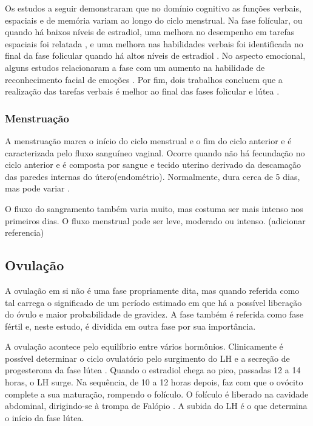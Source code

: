 Os estudos a seguir demonstraram que no domínio cognitivo 
as funções verbais, espaciais e de memória variam ao longo do ciclo 
menstrual. Na fase folícular, ou quando há baixos níveis de estradiol, 
uma melhora no desempenho em tarefas espaciais foi relatada 
\cite{hausmann2000,maki2002, courvoisier2013, becker1982, phillips1992}, 
e uma melhora nas habilidades verbais foi identificada 
no final da fase folicular quando há altos níveis de estradiol 
\cite{Rosenberg2002}. No aspecto emocional, alguns estudos relacionaram a 
fase com um aumento na habilidade de reconhecimento facial de emoções 
\cite{derntl2013}. Por fim, dois trabalhos concluem que a realização das tarefas verbais é melhor 
ao final das fases folicular e lútea \cite{Rosenberg2002, solis2004}.


\subsubsection{Menstruação}

A menstruação marca o início do ciclo menstrual e o fim do ciclo anterior 
e é caracterizada pelo fluxo sanguíneo vaginal. Ocorre quando não há 
fecundação no ciclo anterior e é composta por sangue e tecido uterino 
derivado da descamação das paredes internas do útero(endométrio). 
Normalmente, dura cerca de 5 dias, mas pode variar \cite{guyton2012}.

O fluxo do sangramento também varia muito, mas costuma ser mais intenso nos 
primeiros dias. O fluxo menstrual pode ser leve, moderado ou intenso. (adicionar referencia)

\subsection{Ovulação}

A ovulação em si não é uma fase propriamente dita, mas quando referida 
como tal carrega o significado de um período estimado em que há a 
possível liberação do óvulo e maior probabilidade de gravidez. 
A fase também é referida como fase fértil e, neste estudo, é dividida em 
outra fase por sua importância.

A ovulação acontece pelo equilíbrio entre vários hormônios. 
Clinicamente é possível determinar o ciclo ovulatório pelo surgimento do 
LH e a secreção de progesterona da fase lútea \cite{fritz2010}. 
Quando o estradiol chega ao pico, passadas 12 a 14 horas, o LH surge. 
Na sequência, de 10 a 12 horas depois, faz com que o ovócito complete a 
sua maturação, rompendo o folículo. O folículo é liberado na cavidade 
abdominal, dirigindo-se à trompa de Falópio \cite{fritz2010}. 
A subida do LH é o que determina o início da fase lútea.

